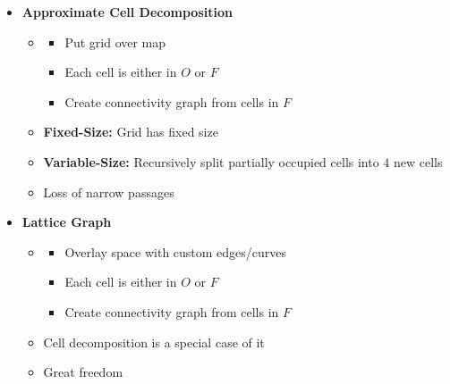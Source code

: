 \documentclass[a4paper]{article}
\newcommand{\ipro}{\item[+]}
\newcommand{\icon}{\item[-]}
\newcommand{\ides}[1]{\item \textbf{#1}}
\begin{document}
\begin{itemize}
\begin{itemize}
\begin{itemize}
                    \item
                        \begin{itemize}
                            \item Draw lines according to obstacle geometry
                            \item Each filed is in either $F$ or $O$
                            \item Create connectivity graph from cells in $F$
                        \end{itemize}
                    \item Assumes: precise position in $F$ does not matter
                        \icon Complexity depends on number and complexity of obstacles
                \end{itemize}
            \ides{Approximate Cell Decomposition}
                \begin{itemize}
                    \item
                        \begin{itemize}
                            \item Put grid over map
                            \item Each cell is either in $O$ or $F$
                            \item Create connectivity graph from cells in $F$
                        \end{itemize}
                        \ides{Fixed-Size:} Grid has fixed size
                        \ides{Variable-Size:} Recursively split partially occupied cells into $4$ new cells
                        \icon Loss of narrow passages
                \end{itemize}
            \ides{Lattice Graph}
                \begin{itemize}
                    \item
                        \begin{itemize}
                            \item Overlay space with custom edges/curves
                            \item Each cell is either in $O$ or $F$
                            \item Create connectivity graph from cells in $F$
                        \end{itemize}
                    \item Cell decomposition is a special case of it
                    \ipro Great freedom

\end{itemize}
\end{itemize}
\end{itemize}
\end{document}
